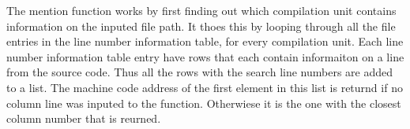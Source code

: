 The mention function works by first finding out which compilation unit contains information on the inputed file path.
It thoes this by looping through all the file entries in the line number information table, for every compilation unit.
Each line number information table entry have rows that each contain informaiton on a line from the source code.
Thus all the rows with the search line numbers are added to a list.
The machine code address of the first element in this list is returnd if no column line was inputed to the function.
Otherwiese it is the one with the closest column number that is reurned.

